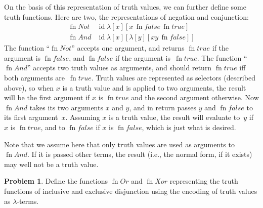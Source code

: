 \documentclass[10pt,a4paper]{article}
\theoremstyle{plain}
\theoremstyle{definition}
\newtheorem{prob}{Problem}[section]
\theoremstyle{remark}
\providecommand{\lambd}{\ensuremath{\lambda}}
\providecommand{\ident}{\operatorname{id}}
\providecommand{\fn}{\operatorname{fn}}
\begin{document}
On the basis of this representation of truth values, we can further
define some truth functions. Here are two, the representations of
negation and conjunction:
\begin{align*}
  \fn{Not} & \ident \lambd[x][x\, \fn{false}\, \fn{true}]\\
  \fn{And} & \ident \lambd[x][\lambd[y][xy \,\fn{false}]]
\end{align*}
The function ``$\fn{Not}$'' accepts one argument, and returns
$\fn{true}$ if the argument is $\fn{false}$, and $\fn{false}$ if the
argument is~$\fn{true}$.  The function ``$\fn{And}$'' accepts two
truth values as arguments, and should return $\fn{true}$ iff both
arguments are~$\fn{true}$. Truth values are represented as selectors
(described above), so when $x$ is a truth value and is applied to two
arguments, the result will be the first argument if $x$ is $\fn{true}$
and the second argument otherwise. Now $\fn{And}$ takes its two
arguments $x$ and $y$, and in return passes $y$ and $\fn{false}$ to
its first argument~$x$. Assuming $x$ is a truth value, the result
will evaluate to~$y$ if $x$ is $\fn{true}$, and to $\fn{false}$ if $x$
is $\fn{false}$, which is just what is desired.

Note that we assume here that only truth values are used as arguments
to $\fn{And}$. If it is passed other terms, the result (i.e., the
normal form, if it exists) may well not be a truth value.

\begin{prob}
  Define the functions $\fn{Or}$ and $\fn{Xor}$ representing the truth
  functions of inclusive and exclusive disjunction using the encoding
  of truth values as $\lambd$-terms.
\end{prob}
\end{document}
